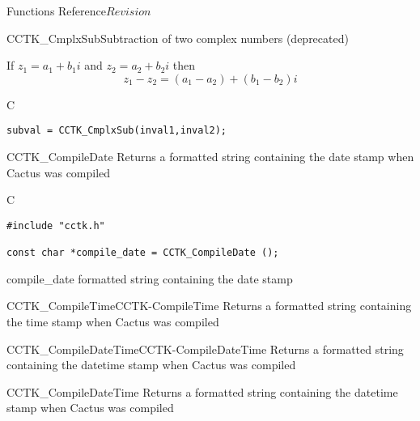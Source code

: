 \begin{cactuspart}{ Functions Reference}{}{$Revision$}
\begin{FunctionDescription}{CCTK\_CmplxSub}{Subtraction of two complex numbers (deprecated)}
\begin{Discussion}
If $z_1=a_1 + b_1 i$ and $z_2 = a_2+ b_2 i$ then
$$
z_1-z_2 = (a_1-a_2)+ (b_1 - b_2)i
$$
\end{Discussion}
\begin{ExampleSection}
\begin{Example}{C}
\begin{verbatim}
subval = CCTK_CmplxSub(inval1,inval2);
\end{verbatim}
\end{Example}
\end{ExampleSection}
\end{FunctionDescription}


\begin{FunctionDescription}{CCTK\_CompileDate}
\label{CCTK-CompileDate}
Returns a formatted string containing the date stamp when Cactus was compiled

\begin{SynopsisSection}
\begin{Synopsis}{C}
\begin{verbatim}
#include "cctk.h"

const char *compile_date = CCTK_CompileDate ();
\end{verbatim}
\end{Synopsis}
\end{SynopsisSection}

\begin{ResultSection}
\begin{Result}{compile\_date}
formatted string containing the date stamp
\end{Result}
\end{ResultSection}

\begin{SeeAlsoSection}
\begin{SeeAlso2}{CCTK\_CompileTime}{CCTK-CompileTime}
  Returns a formatted string containing the time stamp when Cactus was compiled
\end{SeeAlso2}
\begin{SeeAlso2}{CCTK\_CompileDateTime}{CCTK-CompileDateTime}
  Returns a formatted string containing the datetime stamp when Cactus was compiled
\end{SeeAlso2}
\end{SeeAlsoSection}
\end{FunctionDescription}


\begin{FunctionDescription}{CCTK\_CompileDateTime}
\label{CCTK-CompileDateTime}
Returns a formatted string containing the datetime stamp when Cactus was compiled


\end{FunctionDescription}
\end{cactuspart}
